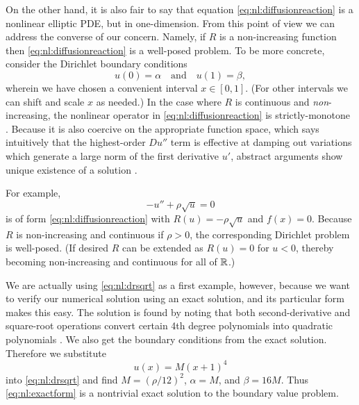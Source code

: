 On the other hand, it is also fair to say that equation \eqref{eq:nl:diffusionreaction} is a nonlinear elliptic PDE, but in one-dimension.  From this point of view we can address the converse of our concern.  Namely, if $R$ is a non-increasing function then \eqref{eq:nl:diffusionreaction} is a well-posed problem.  To be more concrete, consider the Dirichlet boundary conditions
\begin{equation}
u(0)=\alpha \quad \text{and} \quad u(1)=\beta,  \label{eq:nl:drbcs}
\end{equation}
wherein we have chosen a convenient interval $x\in[0,1]$.  (For other intervals we can shift and scale $x$ as needed.)  In the case where $R$ is continuous and \emph{non}-increasing, the nonlinear operator in \eqref{eq:nl:diffusionreaction} is strictly-monotone \citep{KinderlehrerStampacchia1980}.  Because it is also coercive on the appropriate function space, which says intuitively that the highest-order $D u''$ term is effective at damping out variations which generate a large norm of the first derivative $u'$, abstract arguments show unique existence of a solution \citep[pages 93-94]{KinderlehrerStampacchia1980}.

For example,
\begin{equation}
-u'' + \rho \sqrt{u} = 0 \label{eq:nl:drsqrt}
\end{equation}
is of form \eqref{eq:nl:diffusionreaction} with $R(u) = - \rho \sqrt{u}$ and $f(x)=0$.  Because $R$ is non-increasing and continuous if $\rho>0$, the corresponding Dirichlet problem is well-posed.  (If desired $R$ can be extended as $R(u)=0$ for $u<0$, thereby becoming non-increasing and continuous for all of $\mathbb{R}$.)


We are actually using \eqref{eq:nl:drsqrt} as a first example, however, because we want to verify our numerical solution using an exact solution, and its particular form makes this easy.  The solution is found by noting that both second-derivative and square-root operations convert certain 4th degree polynomials into quadratic polynomials \citep{Ockendonetal2003}.  We also get the boundary conditions from the exact solution.  Therefore we substitute
\begin{equation}
u(x)=M(x+1)^4 \label{eq:nl:exactform}
\end{equation}
into \eqref{eq:nl:drsqrt} and find $M=(\rho/12)^2$, $\alpha=M$, and $\beta=16 M$.  Thus \eqref{eq:nl:exactform} is a nontrivial exact solution to the boundary value problem.

